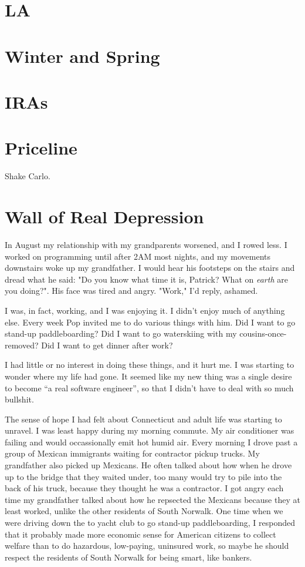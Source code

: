 \documentclass[12pt]{article}
\begin{document}
\section{LA}


\section{Winter and Spring}


\section{IRAs}


\section{Priceline}
Shake Carlo.  


\section{Wall of Real Depression}
In August my relationship with my grandparents worsened, and I rowed less.  I
worked on programming until after 2AM most nights, and my movements downstairs
woke up my grandfather.  I would hear his footsteps on the stairs and dread what
he said: "Do you know what time it is, Patrick?  What on \textit{earth} are you
doing?".  His face was tired and angry. "Work," I'd reply, ashamed.

I was, in fact, working, and I was enjoying it.  I didn't enjoy much of anything
else.  Every week Pop invited me to do various things with him.  Did I want to
go stand-up paddleboarding?  Did I want to go waterskiing with my cousins-once-
removed?  Did I want to get dinner after work?  

I had little or no interest in doing these things, and it hurt me.  I was
starting to wonder where my life had gone.  It seemed like my new thing was
a single desire to become ``a real software engineer'', so that I didn't have to
deal with so much bullshit.  

The sense of hope I had felt about Connecticut and adult life was starting to
unravel.  I was least happy during my morning commute.  My air conditioner was
failing and would occassionally emit hot humid air.  Every morning I drove past
a group of Mexican immigrants waiting for contractor pickup trucks.  My
grandfather also picked up Mexicans.  He often talked about how when he drove up
to the bridge that they waited under, too many would try to pile into the back
of his truck, because they thought he was a contractor.  I got angry each time
my grandfather talked about how he repsected the Mexicans because they at least
worked, unlike the other residents of South Norwalk.  One time when we were
driving down the to yacht club to go stand-up paddleboarding, I responded that
it probably made more economic sense for American citizens to collect welfare
than to do hazardous, low-paying, uninsured work, so maybe he should respect the
residents of South Norwalk for being smart, like bankers. 
\end{document}
